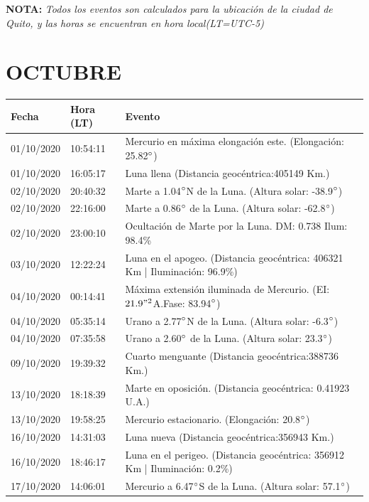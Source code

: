\documentclass[12pt,a4paper,oneside]{article}
\begin{document}
\vspace{1cm}
\textbf{NOTA:  }\textit{Todos los eventos son calculados para la ubicaci\'on de la ciudad de Quito, y las horas se encuentran en hora local(LT=UTC-5)}
\vspace{0.7cm}
\newpage
\section{OCTUBRE}
\begin{center}
\begin{tabular}{ |l| l| l| }
\hline
 \textbf{Fecha} & \textbf{Hora (LT)} & \textbf{Evento}\\
 \hline
01/10/2020 &  10:54:11   &  Mercurio en máxima elongación este. (Elongación: 25.82$\degree$)	  \\
01/10/2020 &  16:05:17   &  Luna llena (Distancia geocéntrica:405149 Km.)	  \\
02/10/2020 &  20:40:32   &  Marte a 1.04$\degree$N de la Luna. (Altura solar: -38.9$\degree$)	  \\
02/10/2020 &  22:16:00   &  Marte a 0.86$\degree$ de la Luna. (Altura solar: -62.8$\degree$)	  \\
02/10/2020 &  23:00:10   &  Ocultación de Marte por la Luna. DM: 0.738 Ilum: 98.4\% 	  \\
03/10/2020 &  12:22:24   &  Luna en el apogeo. (Distancia geocéntrica: 406321 Km | Iluminación: 96.9\%)	  \\
04/10/2020 &  00:14:41   &  Máxima extensión iluminada de Mercurio. (EI: $21.9"^2 $A.Fase: 83.94$\degree$) 	  \\
04/10/2020 &  05:35:14   &  Urano a 2.77$\degree$N de la Luna. (Altura solar: -6.3$\degree$)	  \\
04/10/2020 &  07:35:58   &  Urano a 2.60$\degree$ de la Luna. (Altura solar: 23.3$\degree$)	  \\
09/10/2020 &  19:39:32   &  Cuarto menguante (Distancia geocéntrica:388736 Km.)	  \\
13/10/2020 &  18:18:39   &  Marte en oposición. (Distancia geocéntrica: 0.41923 U.A.)	  \\
13/10/2020 &  19:58:25   &  Mercurio estacionario. (Elongación: 20.8$\degree$)	  \\
16/10/2020 &  14:31:03   &  Luna nueva (Distancia geocéntrica:356943 Km.)	  \\
16/10/2020 &  18:46:17   &  Luna en el perigeo. (Distancia geocéntrica: 356912 Km | Iluminación: 0.2\%)	  \\
17/10/2020 &  14:06:01   &  Mercurio a 6.47$\degree$S de la Luna. (Altura solar: 57.1$\degree$)	  \\

\end{tabular}
\end{center}
\end{document}

